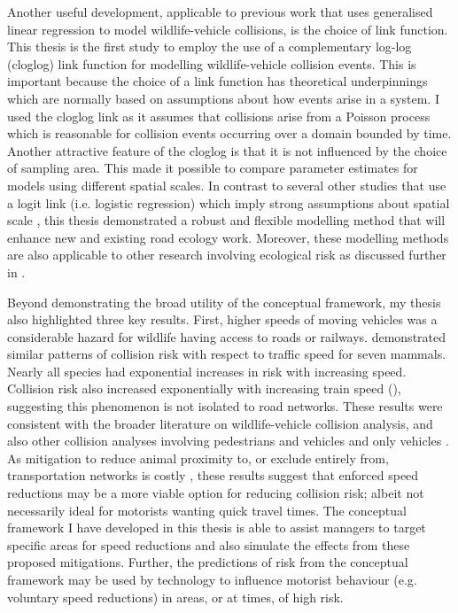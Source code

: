 Another useful development, applicable to previous work that uses generalised linear regression to model wildlife-vehicle collisions, is the choice of link function. This thesis is the first study to employ the use of a complementary log-log (cloglog) link function for modelling wildlife-vehicle collision events. This is important because the choice of a link function has theoretical underpinnings which are normally based on assumptions about how events arise in a system. I used the cloglog link as it assumes that collisions arise from a Poisson process which is reasonable for collision events occurring over a domain bounded by time. Another attractive feature of the cloglog is that it is not influenced by the choice of sampling area. This made it possible to compare parameter estimates for models using different spatial scales.  In contrast to several other studies that use a logit link (i.e. logistic regression) which imply strong assumptions about spatial scale \citep[e.g.][]{seo15,gund98}, this thesis demonstrated a robust and flexible modelling method that will enhance new and existing road ecology work. Moreover, these modelling methods are also applicable to other research involving ecological risk as discussed further in .

Beyond demonstrating the broad utility of the conceptual framework, my thesis also highlighted three key results. First, higher speeds of moving vehicles was a considerable hazard for wildlife having access to roads or railways.  demonstrated similar patterns of collision risk with respect to traffic speed for seven mammals. Nearly all species had exponential increases in risk with increasing speed. Collision risk also increased exponentially with increasing train speed (), suggesting this phenomenon is not isolated to road networks. These results were consistent with the broader literature on wildlife-vehicle collision analysis, and also other collision analyses involving pedestrians and vehicles \citep{rosen09} and only vehicles \citep{liu97}. As mitigation to reduce animal proximity to, or exclude entirely from, transportation networks is costly \citep{huij09}, these results suggest that enforced speed reductions may be a more viable option for reducing collision risk; albeit not necessarily ideal for motorists wanting quick travel times. The conceptual framework I have developed in this thesis is able to assist managers to target specific areas for speed reductions and also simulate the effects from these proposed mitigations. Further, the predictions of risk from the conceptual framework may be used by technology to influence motorist behaviour (e.g. voluntary speed reductions) in areas, or at times, of high risk.

